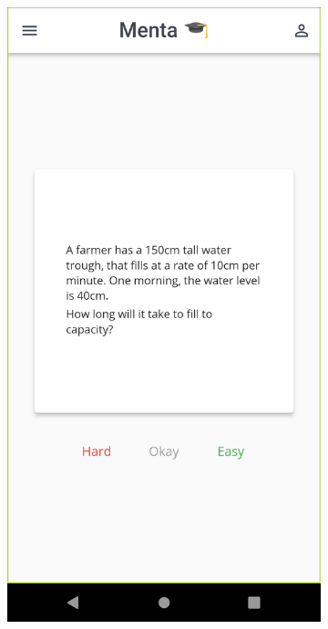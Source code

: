 \begin{figure}[h!]
\begin{subfigure}[b]{0.21\linewidth}
    \includegraphics[width=\linewidth]{resume/imgs/menta/mob1.png}
  \end{subfigure}
  \begin{subfigure}[b]{0.21\linewidth}

\end{subfigure}
\end{figure}
